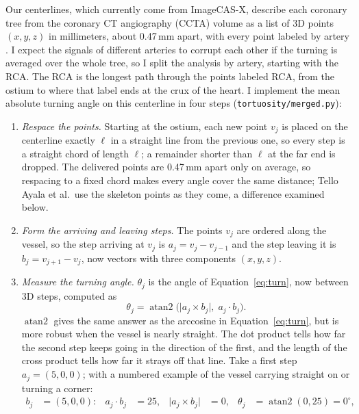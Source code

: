 \noindent Our centerlines, which currently come from ImageCAS-X, describe each coronary tree from the coronary
CT angiography (CCTA) volume as a list of 3D points $(x, y, z)$ in millimeters, about 0.47\,mm apart,
with every point labeled by artery \cite{bransby2026imagecasx}.
I expect the signals of different arteries to corrupt each other if the turning is averaged over
the whole tree, so I split the analysis by artery, starting with the RCA.
The RCA is the longest path through the points labeled RCA, from the ostium to where that label ends
at the crux of the heart.
I implement the mean absolute turning angle on this centerline in four steps
(\texttt{tortuosity/merged.py}):
\begin{enumerate}
  \item \emph{Respace the points.}
    Starting at the ostium, each new point $v_j$ is placed on the centerline exactly $\ell$
    in a straight line from the previous one, so every step is a straight chord of length $\ell$; a
    remainder shorter than $\ell$ at the far end is dropped.
    The delivered points are 0.47\,mm apart only on average, so respacing to a fixed chord makes
    every angle cover the same distance; Tello Ayala et al.\ use the skeleton points as they come, a
    difference examined below.
  \item \emph{Form the arriving and leaving steps.}
    The points $v_j$ are ordered along the vessel, so the step arriving at $v_j$ is
    $a_j = v_j - v_{j-1}$ and the step leaving it is $b_j = v_{j+1} - v_j$, now vectors with three
    components $(x, y, z)$.
  \item \emph{Measure the turning angle.}
    $\theta_j$ is the angle of Equation~\eqref{eq:turn}, now between 3D steps, computed as
    \begin{equation}
      \theta_j = \operatorname{atan2}\bigl(\lvert a_j \times b_j\rvert,\; a_j \cdot b_j\bigr).
      \label{eq:atan2}
    \end{equation}
     $\operatorname{atan2}$ gives the same answer as the arccosine in Equation~\eqref{eq:turn}, but is more robust when the vessel is nearly straight.
     \newline
    The dot product tells how far the second step keeps going in the direction of the first, and the length of the cross product tells how far it strays off that line.
    Take a first step $a_j = (5,0,0)$; with a numbered example of the vessel carrying straight on or turning a corner:
    \begin{align*}
      b_j &= (5,0,0): & a_j \cdot b_j &= 25, & \lvert a_j \times b_j\rvert &= 0, & \theta_j &= \operatorname{atan2}(0, 25) = 0^\circ, \\

\end{align*}
\end{enumerate}
